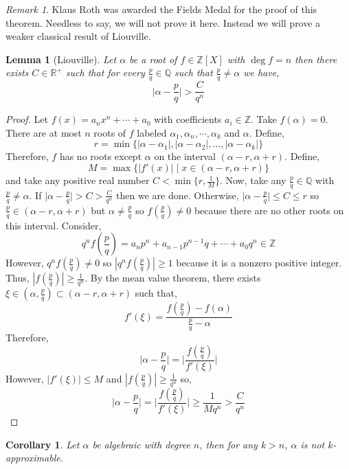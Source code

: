 \documentclass{article}
\newcommand{\Z}{\mathbb{Z}}
\newcommand{\Q}{\mathbb{Q}}
\newcommand{\Rplus}{\mathbb{R}^+}
\theoremstyle{theorem}
\newtheorem{lemma}[theorem]{Lemma}
\newtheorem{corollary}[theorem]{Corollary}
\theoremstyle{definition}
\theoremstyle{definition}
\theoremstyle{remark}
\theoremstyle{definition}
\theoremstyle{remark}
\newtheorem{remark}{Remark}[subsection]
\begin{document}
\begin{remark}
Klaus Roth was awarded the Fields Medal for the proof of this theorem. Needless to say, we will not prove it here. Instead we will prove a weaker classical result of Liouville.
\end{remark}

\begin{lemma}[Liouville]
Let $\alpha$ be a root of $f \in \Z[X]$ with $\deg{f} = n$ then there exists $C \in \Rplus$ such that for every $\frac{p}{q} \in \Q$ such that $\frac{p}{q} \neq \alpha$ we have,
\[ \Big| \alpha - \frac{p}{q} \Big| > \frac{C}{q^n}\]
\end{lemma}

\begin{proof}
Let $f(x) = a_n x^n + \cdots + a_0$ with coefficients $a_i \in \Z$. Take $f(\alpha) = 0$. There are at most $n$ roots of $f$ labeled $\alpha_1, \alpha_n, \cdots, \alpha_k$ and $\alpha$. Define, 
\[r = \min\{|\alpha - \alpha_1|, |\alpha - \alpha_2|, \dots, |\alpha - \alpha_k|\}\]
Therefore, $f$ has no roots except $\alpha$ on the interval $(\alpha - r, \alpha + r)$. Define, 
\[ M = \max \{ |f'(x)| \mid x \in (\alpha - r, \alpha + r) \}\]
and take any positive real number $C < \min\{r, \frac{1}{M}\}$. 
Now, take any $\frac{p}{q} \in \Q$ with $\frac{p}{q} \neq \alpha$. If $\Big| \alpha - \frac{p}{q} \Big| > C > \frac{C}{q^n}$ then we are done. Otherwise, $\Big| \alpha - \frac{p}{q} \Big| \le C \le r$ so $\frac{p}{q} \in (\alpha - r, \alpha + r)$ but $\alpha \neq \frac{p}{q}$ so $f(\frac{p}{q}) \neq 0$ because there are no other roots on this interval. Consider,
\[q^n f\left(\frac{p}{q}\right) = a_n p^n + a_{n-1} p^{n-1}q + \cdots + a_0 q^n \in \Z\]
However, $q^n f(\frac{p}{q}) \neq 0$ so $|q^n f(\frac{p}{q})| \ge 1$ because it is a nonzero positive integer. Thus, $|f(\frac{p}{q})| \ge \frac{1}{q^n}$. By the mean value theorem, there exists $\xi \in (\alpha, \frac{p}{q}) \subset (\alpha - r, \alpha + r)$ such that, \[f'(\xi) = \frac{f(\frac{p}{q}) - f(\alpha)}{\frac{p}{q} - \alpha}\]
Therefore, 
\[\Big| \alpha - \frac{p}{q} \Big| = \Bigg| \frac{f(\frac{p}{q})}{f'(\xi)} \Bigg| \] 
However, $|f'(\xi)| \le M$ and $|f(\frac{p}{q})| \ge \frac{1}{q^n}$ so,
\[\Big| \alpha - \frac{p}{q} \Big| = \Bigg| \frac{f(\frac{p}{q})}{f'(\xi)} \Bigg| \ge \frac{1}{M q^n} > \frac{C}{q^n} \] 
\end{proof}

\begin{corollary}
Let $\alpha$ be algebraic with degree $n$, then for any $k > n$, $\alpha$ is not $k$-approximable. 
\end{corollary}
\end{document}
